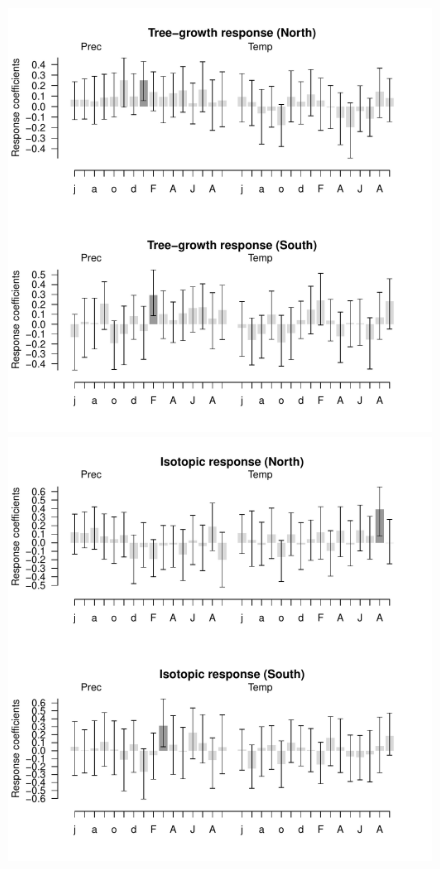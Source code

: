 \documentclass[review,authoryear]{elsarticle}
\begin{document}
\clearpage
\begin{landscape}
\begin{figure}
\begin{minipage}[b]{0.8\textwidth}
\centering
\includegraphics[width = \textwidth]{GrowthFunRes}
\end{minipage}
\begin{minipage}[b]{0.8\textwidth}
\includegraphics[width = \textwidth]{IsoFunRes}

\end{minipage}
\end{figure}
\end{landscape}
\end{document}
